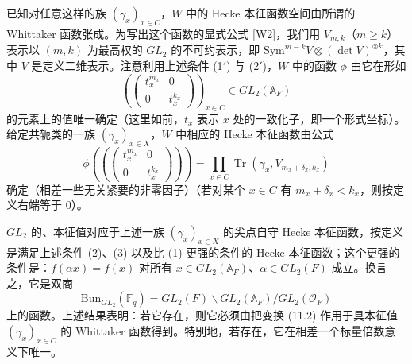 \documentclass[11pt,a4paper]{article}
\newcommand{\Bun}{\mathrm{Bun}}
\newcommand{\Tr}{\operatorname{Tr}}
\begin{document}
已知对任意这样的族 $(\gamma_x)_{x\in C}$，$W$ 中的 Hecke 本征函数空间由所谓的 Whittaker 函数张成。为写出这个函数的显式公式 [W2]，我们用 $V_{m,k}$（$m\geq k$）表示以 $(m,k)$ 为最高权的 $GL_2$ 的不可约表示，即 $\mathrm{Sym}^{m-k}V\otimes(\det V)^{\otimes k}$，其中 $V$ 是定义二维表示。注意利用上述条件 (1$'$) 与 (2$'$)，$W$ 中的函数 $\phi$ 由它在形如
\begin{equation}\tag{11.3}
\left(\begin{pmatrix}t_x^{m_x}&0\\ 0&t_x^{k_x}\end{pmatrix}\right)_{x\in C}\in GL_2(\mathbb{A}_F)
\end{equation}
的元素上的值唯一确定（这里如前，$t_x$ 表示 $x$ 处的一致化子，即一个形式坐标）。给定共轭类的一族 $(\gamma_x)_{x\in X}$，$W$ 中相应的 Hecke 本征函数由公式
\begin{equation}\tag{11.4}
\phi\left(\left(\begin{pmatrix}t_x^{m_x}&0\\ 0&t_x^{k_x}\end{pmatrix}\right)\right)=\prod_{x\in C}\Tr(\gamma_x,V_{m_x+\delta_x,k_x})
\end{equation}
确定（相差一些无关紧要的非零因子）（若对某个 $x\in C$ 有 $m_x+\delta_x<k_x$，则按定义右端等于 0）。

$GL_2$ 的、本征值对应于上述一族 $(\gamma_x)_{x\in X}$ 的尖点自守 Hecke 本征函数，按定义是满足上述条件 (2)、(3) 以及比 (1) 更强的条件的 Hecke 本征函数；这个更强的条件是：$f(\alpha x)=f(x)$ 对所有 $x\in GL_2(\mathbb{A}_F)$、$\alpha\in GL_2(F)$ 成立。换言之，它是双商
\begin{equation}\tag{11.5}
\Bun_{GL_2}(\mathbb{F}_q) = GL_2(F)\backslash GL_2(\mathbb{A}_F)/GL_2(\mathcal{O}_F)
\end{equation}
上的函数。上述结果表明：若它存在，则它必须由把变换 (11.2) 作用于具本征值 $(\gamma_x)_{x\in C}$ 的 Whittaker 函数得到。特别地，若存在，它在相差一个标量倍数意义下唯一。
\end{document}
